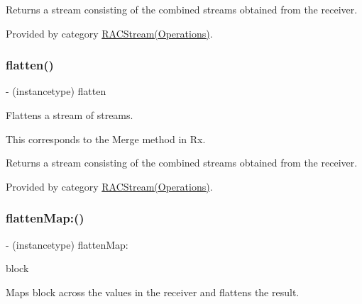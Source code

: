 Returns a stream consisting of the combined streams obtained from the receiver. 

Provided by category \mbox{\hyperlink{category_r_a_c_stream_07_operations_08_a02767823dfe3d4682709e066e15e388c}{R\+A\+C\+Stream(\+Operations)}}.

\mbox{\label{interface_r_a_c_stream_a02767823dfe3d4682709e066e15e388c}} 
\subsubsection{\texorpdfstring{flatten()}{flatten()}\hspace{0.1cm}{\footnotesize\ttfamily [3/3]}}
{\footnotesize\ttfamily -\/ (instancetype) flatten \begin{DoxyParamCaption}{ }\end{DoxyParamCaption}}

Flattens a stream of streams.

This corresponds to the {\ttfamily Merge} method in Rx.

Returns a stream consisting of the combined streams obtained from the receiver. 

Provided by category \mbox{\hyperlink{category_r_a_c_stream_07_operations_08_a02767823dfe3d4682709e066e15e388c}{R\+A\+C\+Stream(\+Operations)}}.

\mbox{\label{interface_r_a_c_stream_a2441b0306adc6ae2845219f8b116119a}} 
\subsubsection{\texorpdfstring{flatten\+Map\+:()}{flattenMap:()}\hspace{0.1cm}{\footnotesize\ttfamily [1/3]}}
{\footnotesize\ttfamily -\/ (instancetype) flatten\+Map\+: \begin{DoxyParamCaption}\item[{(\mbox{\hyperlink{interface_r_a_c_stream}{R\+A\+C\+Stream}} $\ast$($^\wedge$)(id value))}]{block }\end{DoxyParamCaption}}

Maps {\ttfamily block} across the values in the receiver and flattens the result.

